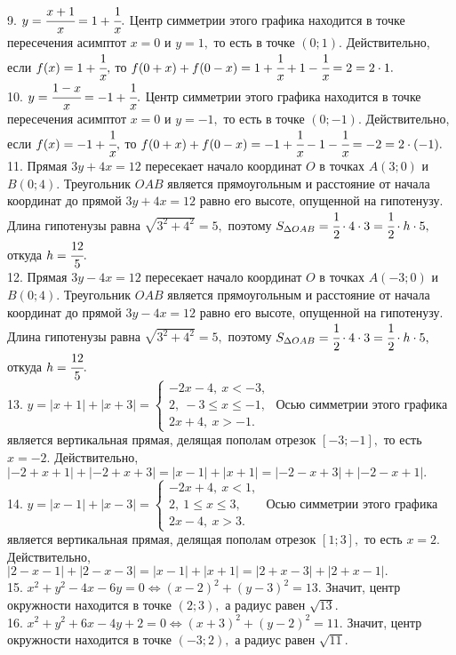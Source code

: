 9. $y=\cfrac{x+1}{x}=1+\cfrac{1}{x}.$ Центр симметрии этого графика находится в точке пересечения асимптот $x=0$ и $y=1,$ то есть в точке $(0;1).$ Действительно, если $f(x)=1+\cfrac{1}{x},$ то $f(0+x)+f(0-x)=1+\cfrac{1}{x}+1-\cfrac{1}{x}=2=2\cdot1.$\\
10. $y=\cfrac{1-x}{x}=-1+\cfrac{1}{x}.$ Центр симметрии этого графика находится в точке пересечения асимптот $x=0$ и $y=-1,$ то есть в точке $(0;-1).$ Действительно, если $f(x)=-1+\cfrac{1}{x},$ то $f(0+x)+f(0-x)=-1+\cfrac{1}{x}-1-\cfrac{1}{x}=-2=2\cdot(-1).$\\
11. Прямая $3y+4x=12$ пересекает начало координат $O$ в точках $A(3;0)$ и $B(0;4).$ Треугольник $OAB$ является прямоугольным и расстояние от начала координат до прямой $3y+4x=12$ равно его высоте, опущенной на гипотенузу. Длина гипотенузы равна $\sqrt{3^2+4^2}=5,$ поэтому $S_{\Delta OAB}=\cfrac{1}{2}\cdot4\cdot3=\cfrac{1}{2}\cdot h\cdot5,$ откуда $h=\cfrac{12}{5}.$\\
12. Прямая $3y-4x=12$ пересекает начало координат $O$ в точках $A(-3;0)$ и $B(0;4).$ Треугольник $OAB$ является прямоугольным и расстояние от начала координат до прямой $3y-4x=12$ равно его высоте, опущенной на гипотенузу. Длина гипотенузы равна $\sqrt{3^2+4^2}=5,$ поэтому $S_{\Delta OAB}=\cfrac{1}{2}\cdot4\cdot3=\cfrac{1}{2}\cdot h\cdot5,$ откуда $h=\cfrac{12}{5}.$\\
13. $y=|x+1|+|x+3|=\begin{cases}-2x-4,\ x<-3,\\ 2,\ -3\leqslant x\leqslant -1,\\ 2x+4,\ x>-1.\end{cases}$ Осью симметрии этого графика является вертикальная прямая, делящая пополам отрезок $[-3;-1],$ то есть $x=-2.$ Действительно, $|-2+x+1|+|-2+x+3|=|x-1|+|x+1|=|-2-x+3|+|-2-x+1|.$\\
14. $y=|x-1|+|x-3|=\begin{cases}-2x+4,\ x<1,\\ 2,\ 1\leqslant x\leqslant 3,\\ 2x-4,\ x>3.\end{cases}$ Осью симметрии этого графика является вертикальная прямая, делящая пополам отрезок $[1;3],$ то есть $x=2.$ Действительно, $|2-x-1|+|2-x-3|=|x-1|+|x+1|=|2+x-3|+|2+x-1|.$\\
15. $x^2+y^2-4x-6y=0\Leftrightarrow (x-2)^2+(y-3)^2=13.$ Значит, центр окружности находится в точке $(2;3),$ а радиус равен $\sqrt{13}.$\\
16. $x^2+y^2+6x-4y+2=0\Leftrightarrow (x+3)^2+(y-2)^2=11.$ Значит, центр окружности находится в точке $(-3;2),$ а радиус равен $\sqrt{11}.$\\
